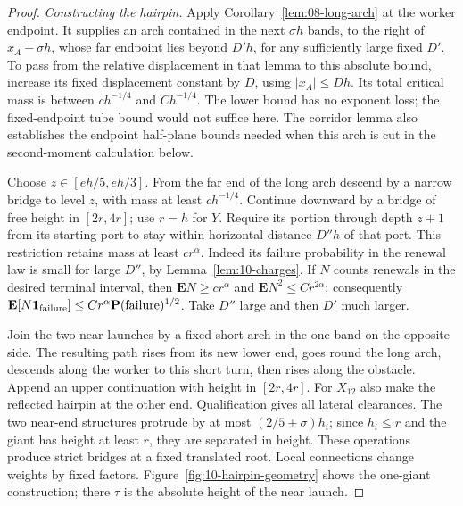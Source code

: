 \begin{proof}
\emph{Constructing the hairpin.}
Apply Corollary~\ref{lem:08-long-arch} at the worker endpoint. It
supplies an arch contained in the next $\sigma h$ bands, to the right
of $x_A-\sigma h$, whose far endpoint lies beyond $D'h$, for any
sufficiently large fixed $D'$. To pass from the relative displacement
in that lemma to this absolute bound, increase its fixed displacement
constant by $D$, using $|x_A|\le Dh$. Its total critical mass is between
$c h^{-1/4}$ and $C h^{-1/4}$. The lower bound has no exponent loss;
the fixed-endpoint tube bound would not suffice here. The corridor
lemma also establishes the endpoint half-plane bounds needed when
this arch is cut in the second-moment calculation below.

Choose \(z\in[eh/5,eh/3]\). From the far end of the long arch descend by
a narrow bridge to level \(z\), with mass at least \(ch^{-1/4}\).
Continue downward by a bridge of free height in \([2r,4r]\); use \(r=h\)
for \(Y\). Require its portion through depth \(z+1\) from its starting
port to stay within horizontal distance \(D''h\) of that port. This
restriction retains mass at least \(cr^\alpha\). Indeed its failure
probability in the renewal law is small for large \(D''\), by
Lemma~\ref{lem:10-charges}. If \(N\) counts renewals in the desired
terminal interval, then \(\mathbf EN\ge cr^\alpha\) and
\(\mathbf EN^2\le Cr^{2\alpha}\); consequently
\(\mathbf E[N\mathbf1_{\rm failure}]\le
 C r^\alpha\mathbf P(\mathrm{failure})^{1/2}\).
Take \(D''\) large and then \(D'\) much larger.

Join the two near launches by a fixed short arch in the one band on the
opposite side. The resulting path rises from its new lower end, goes
round the long arch, descends along the worker to this short turn, then
rises along the obstacle. Append an upper continuation with height in
\([2r,4r]\). For \(X_{12}\) also make the reflected hairpin at the other
end. Qualification gives all lateral clearances. The two near-end
structures protrude by at most \((2/5+\sigma)h_i\); since \(h_i\le r\)
and the giant has height at least \(r\), they are separated in height.
These operations produce strict bridges at a fixed translated root.
Local connections change weights by fixed factors.
Figure~\ref{fig:10-hairpin-geometry} shows the one-giant construction;
there \(\tau\) is the absolute height of the near launch.



\end{proof}
